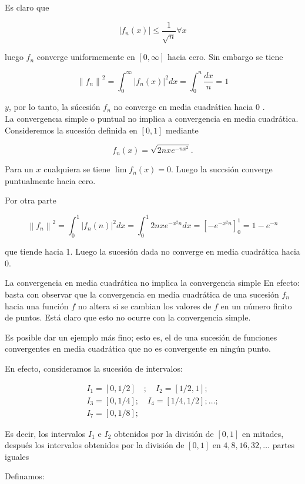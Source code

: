 \documentclass[10pt]{article}
\theoremstyle{plain}
\theoremstyle{definition}
\theoremstyle{remark}
\begin{document}
Es claro que

$$
\left|f_{n}(x)\right| \leqslant \frac{1}{\sqrt{n}} \forall x
$$

luego $f_{n}$ converge uniformemente en $[0, \infty]$ hacia cero. Sin embargo se tiene

$$
\left\|f_{n}\right\|^{2}=\int_{0}^{\infty}\left|f_{n}(x)\right|^{2} d x=\int_{0}^{n} \frac{d x}{n}=1
$$

$y$, por lo tanto, la súcesión $f_{n}$ no converge en media cuadrática hacia 0 .\\
La convergencıa simple o puntual no implica a convergencia en media cuadrática. Consideremos la sucesión definida en $[0,1]$ mediante


$$
f_{n}(x)=\sqrt{2 n x e^{-n x^{2}}} .
$$

Para un $x$ cualquiera se tiene $\lim f_{n}(x)=0$. Luego la succsión converge puntualmente hacia cero.

Por otra parte

$$
\left\|f_{n}\right\|^{2}=\int_{0}^{1}\left|f_{n}(n)\right|^{2} d x=\int_{0}^{1} 2 n x e^{-x^{2} n} d x=\left[-e^{-x^{2} n}\right]_{0}^{1}=1-e^{-n}
$$

que tiende hacia 1. Luego la sucesión dada no converge en media cuadrática hacia 0.

La convergencia en media cuadrática no implica la convergencia simple En efecto: basta con observar que la convergencia en media cuadrática de una sucesión $f_{n}$ hacia una función $f$ no altera si se cambian los valores de $f$ en un número finito de puntos. Está claro que esto no ocurre con la convergencia simple.

Es posible dar un ejemplo más fino; esto es, el de una sucesión de funciones convergentes en media cuadrática que no es convergente en ningún punto.

En efecto, consideramos la sucesión de intervalos:

$$
\begin{array}{ll}
I_{1}=[0,1 / 2] \quad ; \quad I_{2}=[1 / 2,1] ; \\
I_{3}=[0,1 / 4] ; \quad I_{4}=[1 / 4,1 / 2] ; \ldots ; \\
I_{7}=[0,1 / 8] ;
\end{array}
$$

Es decir, los intervalos $I_{1}$ e $I_{2}$ obtenidos por la división de $[0,1]$ en mitades, después los intervalos obtenidos por la división de $[0,1]$ en $4,8,16,32, \ldots$ partes iguales

Definamos:
\end{document}
